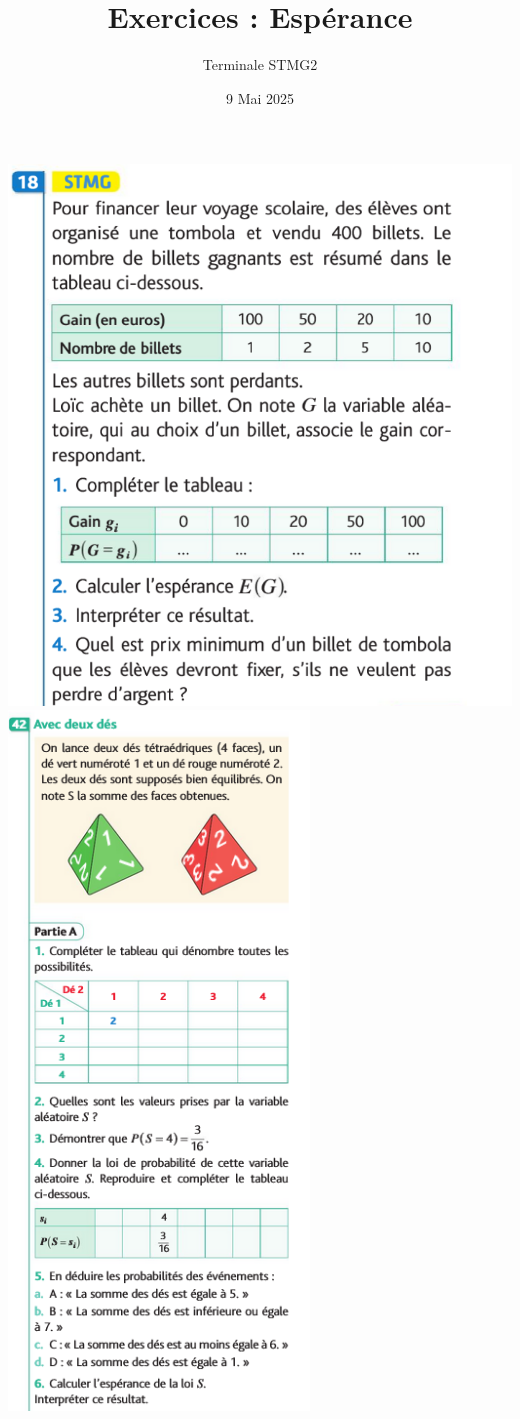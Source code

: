 \documentclass{article}
\title{Exercices : Espérance}
\date{9 Mai 2025}
\author{Terminale STMG2}
\begin{document}
\maketitle
\begin{center}
\includegraphics[width=\textwidth]{Exercice_esperance_2.png}
\includegraphics[width=0.6\textwidth]{Exercice_esperance_1.png}
\end{center}
\end{document}
